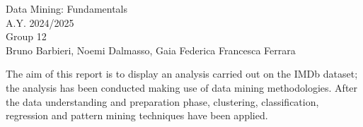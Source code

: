 \documentclass[11pt,openany]{report}
\begin{document}

\begin{center}  
     {\LARGE { Data Mining: Fundamentals}}\\
     \vspace{2cm}
    {\Large { A.Y. 2024/2025 }}\\
    \vspace{2cm}
    {\Large { Group 12 }}\\
     \vspace{2cm}
     {\large { Bruno Barbieri, Noemi Dalmasso, Gaia Federica Francesca Ferrara }}
\end{center}

The aim of this report is to display an analysis carried out on the IMDb dataset; the analysis has been conducted making use of data mining methodologies. 
After the data understanding and preparation phase, clustering, classification, regression and pattern mining techniques have been applied.


  



\tableofcontents

%

\setcounter{page}{1}






\clearpage


\printbibliography
\end{document}

